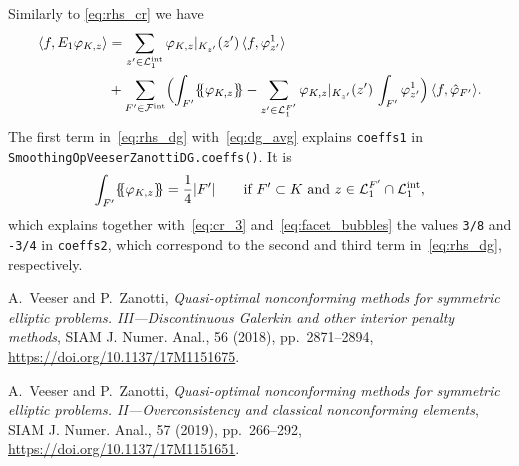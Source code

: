 \documentclass[oneeqnum]{siamart220329}
\newcommand*{\ldblbrace}{\{\mskip-5mu\{}
\newcommand*{\rdblbrace}{\}\mskip-5mu\}}
\begin{document}
Similarly to \cref{eq:rhs_cr} we have
%
\begin{equation}
  \label{eq:rhs_dg}
  \begin{aligned}
    \langle f, E_1 \varphi_{K,z} \rangle
    &= \sum_{z'\in\mathcal{L}^{\mathrm{int}}_1} \varphi_{K,z}|_{K_{z'}}(z')
      \, \langle f, \varphi^1_{z'} \rangle
    \\
    &+ \sum_{F'\in \mathcal{F}^{\mathrm{int}}} \Bigl( \int_{F'} \ldblbrace
      \varphi_{K,z} \rdblbrace - \sum_{z'\in\mathcal{L}^{F'}_1}
      \varphi_{K,z}|_{K_{z'}}(z') \, \int_{F'} \varphi_{z'}^1 \Bigr)
      \, \langle f, \hat\varphi_{F'} \rangle.
  \end{aligned}
\end{equation}
%
The first term in~\cref{eq:rhs_dg} with~\cref{eq:dg_avg} explains
\texttt{coeffs1} in \texttt{SmoothingOpVeeserZanottiDG\allowbreak.coeffs()}.
It is
%
\begin{equation*}
  \int_{F'} \ldblbrace \varphi_{K,z} \rdblbrace = \frac14 |F'|
  \qquad \text{if $F'\subset K$ and
               $z\in\mathcal{L}^{F'}_1\cap\mathcal{L}^{\mathrm{int}}_1$,}
\end{equation*}
%
which explains together with~\cref{eq:cr_3} and~\cref{eq:facet_bubbles}
the values \texttt{3/8} and \texttt{-3/4} in \texttt{coeffs2}, which
correspond to the second and third term in~\cref{eq:rhs_dg}, respectively.


\begin{thebibliography}{1}
\raggedbottom
{}

{\sc A.~Veeser and P.~Zanotti}, {\em Quasi-optimal nonconforming methods for
  symmetric elliptic problems. {III}---{D}iscontinuous {G}alerkin and other
  interior penalty methods}, SIAM J. Numer. Anal., 56 (2018), pp.~2871--2894,
  \url{https://doi.org/10.1137/17M1151675}.

{\sc A.~Veeser and P.~Zanotti}, {\em Quasi-optimal nonconforming methods for
  symmetric elliptic problems. {II}---{O}verconsistency and classical
  nonconforming elements}, SIAM J. Numer. Anal., 57 (2019), pp.~266--292,
  \url{https://doi.org/10.1137/17M1151651}.

\end{thebibliography}
\end{document}
